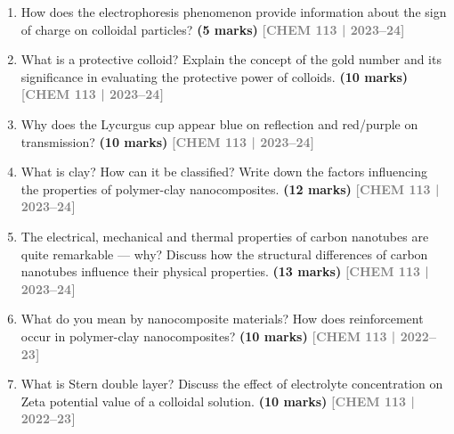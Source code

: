 \documentclass[12pt,a3paper]{article}
\newcommand{\yr}[1]{\hfill\textcolor{gray}{\small\textbf{[#1]}}}
\newcommand{\mk}[1]{\textcolor{orange!70!black}{\small\textbf{(#1 marks)}}}
\begin{document}
\begin{enumerate}
\item How does the electrophoresis phenomenon provide information about the sign of charge on colloidal particles? \mk{5}
\yr{CHEM 113 | 2023--24}




\item What is a protective colloid? Explain the concept of the gold number and its significance in evaluating the protective power of colloids. \mk{10}
\yr{CHEM 113 | 2023--24}




\item Why does the Lycurgus cup appear blue on reflection and red/purple on transmission? \mk{10}
\yr{CHEM 113 | 2023--24}




\item What is clay? How can it be classified? Write down the factors influencing the properties of polymer-clay nanocomposites. \mk{12}
\yr{CHEM 113 | 2023--24}





\item The electrical, mechanical and thermal properties of carbon nanotubes are quite remarkable --- why? Discuss how the structural differences of carbon nanotubes influence their physical properties. \mk{13}
\yr{CHEM 113 | 2023--24}




\item What do you mean by nanocomposite materials? How does reinforcement occur in polymer-clay nanocomposites? \mk{10}
\yr{CHEM 113 | 2022--23}





\item What is Stern double layer? Discuss the effect of electrolyte concentration on Zeta potential value of a colloidal solution. \mk{10}
\yr{CHEM 113 | 2022--23}


\end{enumerate}
\end{document}
